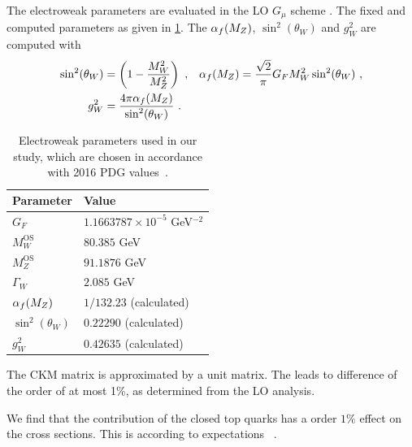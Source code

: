 The electroweak parameters are evaluated in the LO $G_\mu$ scheme \cite{Denner2000c}. The fixed and computed
parameters as given in \cref{tab:ewinput}. The $\alpha_f(M_Z)$,
$\sin^2(\theta_W)$ and $g_W^2$ are computed with
\begin{align}\label{eq:ewlorel}
\sin^2(\theta_W) &= \left(1-\frac{M_W^2}{M_Z^2}\right)\ , & \alpha_f(M_Z)&=\frac{\sqrt{2}}{\pi}G_F M_W^2
  \sin^2(\theta_W)\ ,\notag\\
g_W^2&=\frac{4\pi\alpha_f(M_Z) }{\sin^2(\theta_W)}\ .
\end{align}

\begin{table}[]
  \centering
  \begin{tabular}{p{3.5cm}p{5cm}}
    \toprule
    Parameter & Value  \\
    \midrule
    $G_F$ & $1.1663787 \times 10^{-5}$ GeV$^{-2}$ \\
    $M_W^{\text{OS}}$& $80.385$ GeV \\
    $M_Z^{\text{OS}}$& $91.1876$ GeV \\
    $\Gamma_W$& $2.085$ GeV \\
    $\alpha_f(M_Z)$ & $1/132.23$ (calculated)\\
    $\sin^2(\theta_W)$ & $0.22290$ (calculated)\\
    $g_W^2$ & $0.42635$ (calculated)\\
    \bottomrule
  \end{tabular}
  \caption{Electroweak parameters used in our study, which are chosen in accordance with 2016 PDG values~\cite{Patrignani:2016xqp}.}
  \label{tab:ewinput}
\end{table}

The CKM matrix is approximated by a unit matrix. 
The leads to difference of  the order of at most 1\%,
as determined from the LO analysis.

We find that the contribution of the closed top quarks has a order $1\%$ effect on
the cross sections. This is according to expectations ~\cite{BH:W4j,BH:Z4j,Campbell:2016tcu}. 

